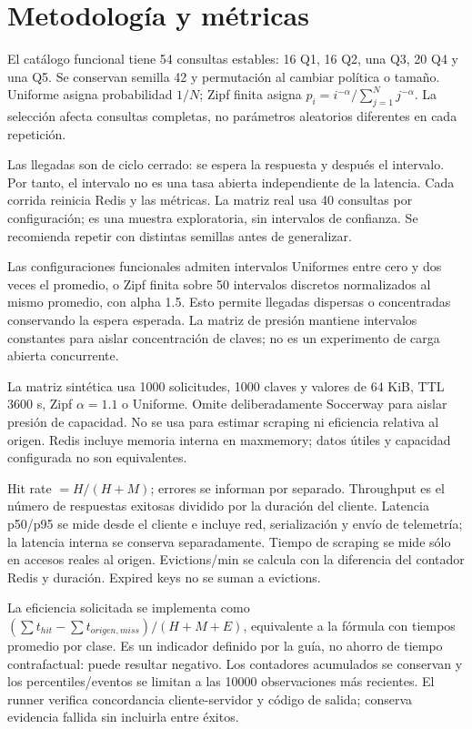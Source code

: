 \documentclass[11pt]{article}
\begin{document}
\section{Metodología y métricas}
El catálogo funcional tiene 54 consultas estables: 16 Q1, 16 Q2, una Q3, 20 Q4 y una Q5. Se conservan semilla 42 y permutación al cambiar política o tamaño. Uniforme asigna probabilidad $1/N$; Zipf finita asigna $p_i=i^{-\alpha}/\sum_{j=1}^N j^{-\alpha}$. La selección afecta consultas completas, no parámetros aleatorios diferentes en cada repetición.

Las llegadas son de ciclo cerrado: se espera la respuesta y después el intervalo. Por tanto, el intervalo no es una tasa abierta independiente de la latencia. Cada corrida reinicia Redis y las métricas. La matriz real usa 40 consultas por configuración; es una muestra exploratoria, sin intervalos de confianza. Se recomienda repetir con distintas semillas antes de generalizar.

Las configuraciones funcionales admiten intervalos Uniformes entre cero y dos veces el promedio, o Zipf finita sobre 50 intervalos discretos normalizados al mismo promedio, con alpha 1.5. Esto permite llegadas dispersas o concentradas conservando la espera esperada. La matriz de presión mantiene intervalos constantes para aislar concentración de claves; no es un experimento de carga abierta concurrente.

La matriz sintética usa 1000 solicitudes, 1000 claves y valores de 64 KiB, TTL 3600 s, Zipf $\alpha=1.1$ o Uniforme. Omite deliberadamente Soccerway para aislar presión de capacidad. No se usa para estimar scraping ni eficiencia relativa al origen. Redis incluye memoria interna en maxmemory; datos útiles y capacidad configurada no son equivalentes.

Hit rate $=H/(H+M)$; errores se informan por separado. Throughput es el número de respuestas exitosas dividido por la duración del cliente. Latencia p50/p95 se mide desde el cliente e incluye red, serialización y envío de telemetría; la latencia interna se conserva separadamente. Tiempo de scraping se mide sólo en accesos reales al origen. Evictions/min se calcula con la diferencia del contador Redis y duración. Expired keys no se suman a evictions.

La eficiencia solicitada se implementa como $(\sum t_{hit}-\sum t_{origen,miss})/(H+M+E)$, equivalente a la fórmula con tiempos promedio por clase. Es un indicador definido por la guía, no ahorro de tiempo contrafactual: puede resultar negativo. Los contadores acumulados se conservan y los percentiles/eventos se limitan a las 10000 observaciones más recientes. El runner verifica concordancia cliente-servidor y código de salida; conserva evidencia fallida sin incluirla entre éxitos.
\end{document}
